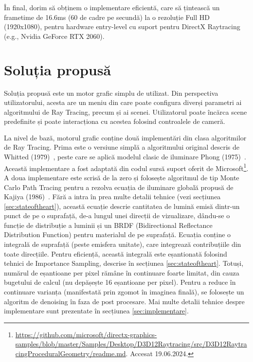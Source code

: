\documentclass[12pt,a4paper]{report}
\numberwithin{equation}{section} %
\begin{document}
În final, dorim să obținem o implementare eficientă, care să țintească un frametime de 16.6ms
(60 de cadre pe secundă) la o rezoluție Full HD (1920x1080), pentru hardware entry-level cu suport pentru
DirectX Raytracing (e.g., Nvidia GeForce RTX 2060).

\subsubsection*{}

\section{Soluția propusă}
Soluția propusă este un motor grafic simplu de utilizat. Din perspectiva utilizatorului,
acesta are un meniu din care poate configura diverși parametri ai algoritmului
de Ray Tracing, precum și ai scenei. Utilizatorul poate încărca scene predefinite
și poate interacționa cu acestea folosind controalele de cameră.

La nivel de bază, motorul grafic conține două implementări din clasa algoritmilor
de Ray Tracing. Prima este o versiune simplă a algoritmului original descris de
Whitted (1979)~\cite{Whitted}, peste care se aplică modelul clasic de iluminare
Phong (1975)~\cite{Phong}. Această implementare a fost adaptată din codul sursă
suport oferit de Microsoft\footnote{\url{https://github.com/microsoft/directx-graphics-samples/blob/master/Samples/Desktop/D3D12Raytracing/src/D3D12RaytracingProceduralGeometry/readme.md}. Accesat 19.06.2024.}.
A doua implementare este scrisă de la zero și folosește algoritmul de tip Monte Carlo
Path Tracing pentru a rezolva ecuația de iluminare globală propusă de Kajiya (1986)~\cite{Kajiya}.
Fără a intra în prea multe detalii tehnice (vezi secțiunea \ref{sec:stateoftheart}),
această ecuație descrie cantitatea de lumină emisă dintr-un punct de pe o suprafață,
de-a lungul unei direcții de vizualizare, dându-se o funcție de distribuție a luminii
și un BRDF (Bidirectional Reflectance Distribution Function) pentru materialul de pe
suprafață. Ecuația conține o integrală de suprafață (peste emisfera unitate), care
integrează contribuțiile din toate direcțiile. Pentru eficiență, această integrală
este eșantionată folosind tehnici de Importance Sampling, descrise în secțiunea \ref{sec:stateoftheart}.
Totuși, numărul de eșantioane per pixel rămâne în continuare foarte limitat, din
cauza bugetului de calcul (nu depășește 16 eșantioane per pixel). Pentru a reduce
în continuare varianța (manifestată prin zgomot în imaginea finală), se folosește
un algoritm de denoising în faza de post procesare. Mai multe detalii tehnice
despre implementare sunt prezentate în secțiunea \ref{sec:implementare}.
\end{document}
